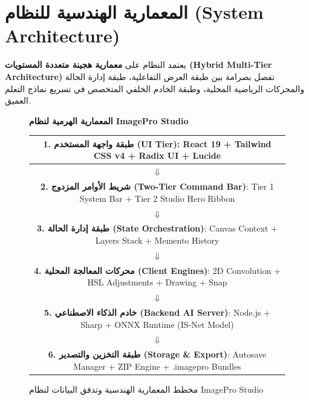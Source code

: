 \documentclass[12pt,a4paper]{report}
\begin{document}
\chapter{المعمارية الهندسية للنظام (System Architecture)}

يعتمد النظام على \textbf{معمارية هجينة متعددة المستويات (Hybrid Multi-Tier Architecture)} تفصل بصرامة بين طبقة العرض التفاعلية، طبقة إدارة الحالة والمحركات الرياضية المحلية، وطبقة الخادم الخلفي المتخصص في تسريع نماذج التعلم العميق.

\begin{figure}[htbp]
    \centering
    \begin{tcolorbox}[colback=white,colframe=StudioBorder,arc=2mm,width=0.98\textwidth]
        \centering
        \textbf{المعمارية الهرمية لنظام ImagePro Studio}\\[0.3cm]
        \begin{tabular}{|c|}
            \hline
            \textbf{1. طبقة واجهة المستخدم (UI Tier)}: React 19 + Tailwind CSS v4 + Radix UI + Lucide \\
            \hline
            $\Downarrow$ \\
            \hline
            \textbf{2. شريط الأوامر المزدوج (Two-Tier Command Bar)}: Tier 1 System Bar + Tier 2 Studio Hero Ribbon \\
            \hline
            $\Downarrow$ \\
            \hline
            \textbf{3. طبقة إدارة الحالة (State Orchestration)}: Canvas Context + Layers Stack + Memento History \\
            \hline
            $\Downarrow$ \\
            \hline
            \textbf{4. محركات المعالجة المحلية (Client Engines)}: 2D Convolution + HSL Adjustments + Drawing + Snap \\
            \hline
            $\Downarrow$ \\
            \hline
            \textbf{5. خادم الذكاء الاصطناعي (Backend AI Server)}: Node.js + Sharp + ONNX Runtime (IS-Net Model) \\
            \hline
            $\Downarrow$ \\
            \hline
            \textbf{6. طبقة التخزين والتصدير (Storage \& Export)}: Autosave Manager + ZIP Engine + .imagepro Bundles \\
            \hline
        \end{tabular}
    \end{tcolorbox}
    \caption{مخطط المعمارية الهندسية وتدفق البيانات لنظام ImagePro Studio}
    \label{fig:arch}
\end{figure}
\end{document}
